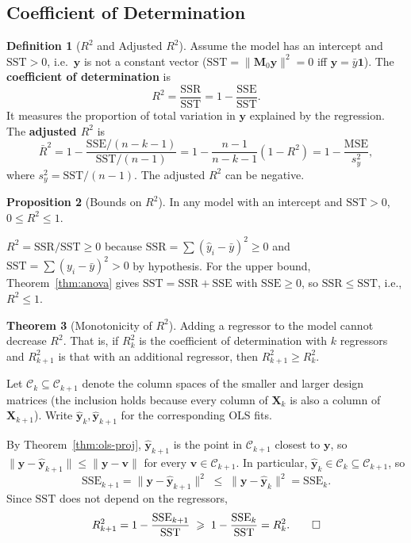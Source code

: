 \documentclass[12pt,a4paper]{article}
\makeatletter
\theoremstyle{definition}
\newtheorem{theorem}{Theorem}[section]
\newtheorem{definition}[theorem]{Definition}
\newtheorem{proposition}[theorem]{Proposition}
\renewenvironment{proof}[1][\proofname]{\par
  \pushQED{\qed}%
  \normalfont \topsep6\p@\@plus6\p@\relax
  \trivlist
  \item[\hskip\labelsep\bfseries #1\@addpunct{.}]\ignorespaces
}{%
  \popQED\endtrivlist\@endpefalse
}
\newcommand{\SST}{\mathrm{SST}}
\newcommand{\SSR}{\mathrm{SSR}}
\newcommand{\SSE}{\mathrm{SSE}}
\newcommand{\MSE}{\mathrm{MSE}}
\newcommand{\bX}{\mathbf{X}}
\newcommand{\by}{\mathbf{y}}
\newcommand{\bM}{\mathbf{M}}
\newcommand{\bone}{\mathbf{1}}
\newcommand{\bv}{\mathbf{v}}
\newcommand{\calC}{\mathcal{C}}
\makeatother
\begin{document}
\subsection{Coefficient of Determination}

\begin{definition}[$R^2$ and Adjusted $R^2$]\label{def:R2}
Assume the model has an intercept and $\SST > 0$, i.e.\ $\by$ is not a constant vector ($\SST = \|\bM_0\by\|^2 = 0$ iff $\by = \bar y\bone$). The \textbf{coefficient of determination} is
\begin{equation}
R^2 = \frac{\SSR}{\SST} = 1 - \frac{\SSE}{\SST}.
\end{equation}
It measures the proportion of total variation in $\by$ explained by the regression. The \textbf{adjusted $R^2$} is
\begin{equation}
\bar{R}^2 = 1 - \frac{\SSE/(n-k-1)}{\SST/(n-1)} = 1 - \frac{n-1}{n-k-1}(1 - R^2) = 1 - \frac{\MSE}{s_y^2},
\end{equation}
where $s_y^2 = \SST/(n-1)$. The adjusted $R^2$ can be negative.
\end{definition}

\begin{proposition}[Bounds on $R^2$]\label{prop:R2-bounds}
In any model with an intercept and $\SST > 0$, $0 \leqslant R^2 \leqslant 1$.
\end{proposition}

\begin{proof}
$R^2 = \SSR/\SST \geqslant 0$ because $\SSR = \sum(\hat{y}_i - \bar{y})^2 \geqslant 0$ and $\SST = \sum(y_i - \bar{y})^2 > 0$ by hypothesis. For the upper bound, Theorem~\ref{thm:anova} gives $\SST = \SSR + \SSE$ with $\SSE \geqslant 0$, so $\SSR \leqslant \SST$, i.e., $R^2 \leqslant 1$.
\end{proof}

\begin{theorem}[Monotonicity of $R^2$]\label{thm:R2-monotone}
Adding a regressor to the model cannot decrease $R^2$. That is, if $R^2_k$ is the coefficient of determination with $k$ regressors and $R^2_{k+1}$ is that with an additional regressor, then $R^2_{k+1} \geqslant R^2_k$.
\end{theorem}

\begin{proof}
Let $\calC_k \subseteq \calC_{k+1}$ denote the column spaces of the smaller and larger design matrices (the inclusion holds because every column of $\bX_k$ is also a column of $\bX_{k+1}$). Write $\hat{\by}_k, \hat{\by}_{k+1}$ for the corresponding OLS fits.

By Theorem~\ref{thm:ols-proj}, $\hat{\by}_{k+1}$ is the point in $\calC_{k+1}$ closest to $\by$, so $\|\by - \hat{\by}_{k+1}\| \leqslant \|\by - \bv\|$ for every $\bv \in \calC_{k+1}$. In particular, $\hat{\by}_k \in \calC_k \subseteq \calC_{k+1}$, so
\[
\SSE_{k+1} = \|\by - \hat{\by}_{k+1}\|^2 \;\leqslant\; \|\by - \hat{\by}_k\|^2 = \SSE_k.
\]
Since $\SST$ does not depend on the regressors,
\[
R^2_{k+1} = 1 - \frac{\SSE_{k+1}}{\SST} \;\geqslant\; 1 - \frac{\SSE_k}{\SST} = R^2_k. \qedhere
\]
\end{proof}
\end{document}

